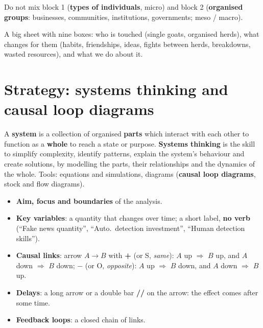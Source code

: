 \documentclass[11pt,a4paper,openany]{book}
\begin{document}
\begin{warnbox}[title={Common difficulty}]
Do not mix block 1 (\textbf{types of individuals}, micro) and block 2 (\textbf{organised groups}:
businesses, communities, institutions, governments; meso / macro).
\end{warnbox}

\begin{goatbox}
A big sheet with nine boxes: who is touched (single goats, organised herds), what changes for
them (habits, friendships, ideas, fights between herds, breakdowns, wasted resources), and what
we do about it.
\end{goatbox}


\section{Strategy: systems thinking and causal loop diagrams}

\begin{defnbox}[title={System and systems thinking (Kauffman, 1980; Meadows, 2008; Crowley, 2022)}]
A \textbf{system} is a collection of organised \textbf{parts} which interact with each other to
function as a \textbf{whole} to reach a state or purpose. \textbf{Systems thinking} is the skill
to simplify complexity, identify patterns, explain the system's behaviour and create solutions,
by modelling the parts, their relationships and the dynamics of the whole. Tools: equations and
simulations, diagrams (\textbf{causal loop diagrams}, stock and flow diagrams).
\end{defnbox}

\begin{defnbox}[title={Elements of a causal loop diagram (cheat sheet 2.5)}]
\begin{itemize}
  \item \textbf{Aim, focus and boundaries} of the analysis.
  \item \textbf{Key variables}: a quantity that changes over time; a short label, \textbf{no
        verb} (``Fake news quantity'', ``Auto.\ detection investment'', ``Human detection
        skills'').
  \item \textbf{Causal links}: arrow $A \to B$ with
        \textbf{+} (or S, \emph{same}): $A$ up $\Rightarrow$ $B$ up, and $A$ down $\Rightarrow$
        $B$ down; \textbf{$-$} (or O, \emph{opposite}): $A$ up $\Rightarrow$ $B$ down, and $A$
        down $\Rightarrow$ $B$ up.
  \item \textbf{Delays}: a long arrow or a double bar \textbf{//} on the arrow: the effect comes
        after some time.
  \item \textbf{Feedback loops}: a closed chain of links.
\end{itemize}
\end{defnbox}
\end{document}
